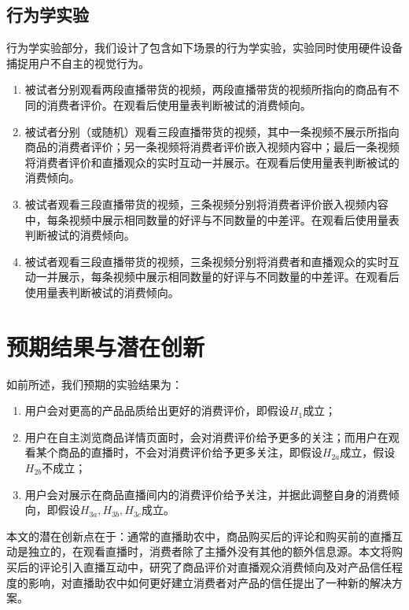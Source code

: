 \documentclass{../notes}
\begin{document}
    \subsection{行为学实验}

    行为学实验部分，我们设计了包含如下场景的行为学实验，实验同时使用硬件设备捕捉用户不自主的视觉行为。

    \begin{enumerate}
        \item 被试者分别观看两段直播带货的视频，两段直播带货的视频所指向的商品有不同的消费者评价。在观看后使用量表判断被试的消费倾向。
        \item 被试者分别（或随机）观看三段直播带货的视频，其中一条视频不展示所指向商品的消费者评价；另一条视频将消费者评价嵌入视频内容中；最后一条视频将消费者评价和直播观众的实时互动一并展示。在观看后使用量表判断被试的消费倾向。
        \item 被试者观看三段直播带货的视频，三条视频分别将消费者评价嵌入视频内容中，每条视频中展示相同数量的好评与不同数量的中差评。在观看后使用量表判断被试的消费倾向。
        \item 被试者观看三段直播带货的视频，三条视频分别将消费者和直播观众的实时互动一并展示，每条视频中展示相同数量的好评与不同数量的中差评。在观看后使用量表判断被试的消费倾向。
    \end{enumerate}

    \section{预期结果与潜在创新}

    如前所述，我们预期的实验结果为：

    \begin{enumerate}
        \item 用户会对更高的产品品质给出更好的消费评价，即假设$H_1$成立；
        \item 用户在自主浏览商品详情页面时，会对消费评价给予更多的关注；而用户在观看某个商品的直播时，不会对消费评价给予更多关注，即假设$H_{2a}$成立，假设$H_{2b}$不成立；
        \item 用户会对展示在商品直播间内的消费评价给予关注，并据此调整自身的消费倾向，即假设$H_{3a}, H_{3b}, H_{3c}$成立。
    \end{enumerate}

    本文的潜在创新点在于：通常的直播助农中，商品购买后的评论和购买前的直播互动是独立的，在观看直播时，消费者除了主播外没有其他的额外信息源。本文将购买后的评论引入直播互动中，研究了商品评价对直播观众消费倾向及对产品信任程度的影响，对直播助农中如何更好建立消费者对产品的信任提出了一种新的解决方案。

    
    
\end{document}
